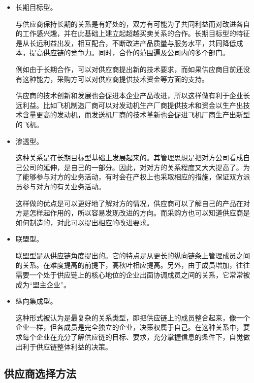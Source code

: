\begin{enumerate.zh}
\begin{itemize}
            \item  长期目标型。

            与供应商保持长期的关系是有好处的，双方有可能为了共同利益而对改进各自的工作感兴趣，并在此基础上建立起超越买卖关系的合作。长期目标型的特征是从长远利益出发，相互配合，不断改进产品质量与服务水平，共同降低成本，提高供应链的竞争力。同时，合作的范围遍及公司内的多个部门。

            例如由于长期合作，可以对供应商提出新的技术要求，而如果供应商目前还没有这种能力，采购方可以对供应商提供技术资金等方面的支持。

            供应商的技术创新和发展也会促进本企业产品改进，所以这样做有利于企业长远利益。比如飞机制造厂商可以对发动机生产厂商提供技术和资金以生产出技术含量更高的发动机，而发送机厂商的技术革新也会促进飞机厂商生产出新型的飞机。

            \item  渗透型。

            这种关系是在长期目标型基础上发展起来的。其管理思想是把对方公司看成自己公司的延伸，是自己的一部分。因此，对对方的关系程度又大大提高了。为了能够参与对方的业务活动，有时会在产权上也采取相应的措施，保证双方派员参与对方的有关业务活动。

            这样做的优点是可以更好地了解对方的情况，供应商可以了解自己的产品在对方是怎样起作用的，所以容易发现改进的方向。而采购方也可以知道供应商是如何制造的，对此可以提出相应的改进要求。

            \item  联盟型。

            联盟型是从供应链角度提出的。它的特点是从更长的纵向链条上管理成员之间的关系。在难度提高的前提下，高秋叶相应提高。另外，由于成员增加，往往需要一个处于供应链上的核心地位的企业出面协调成员之间的关系，它常常被成为“盟主企业”。

            \item  纵向集成型。

            这种形式被认为是最复杂的关系类型，即把供应链上的成员整合起来，像一个企业一样，但各成员是完全独立的企业，决策权属于自己。在这种关系中，要求每个企业在充分了解供应链的目标、要求，充分掌握信息的条件下，自觉做出利于供应链整体利益的决策。

        \end{itemize}

    \end{enumerate.zh}

\subsection {供应商选择方法}


